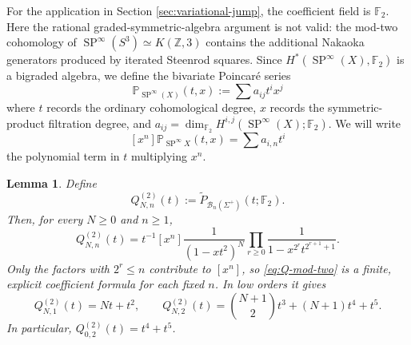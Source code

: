 \documentclass[11pt,a4paper]{article}
\numberwithin{equation}{section}
\newtheorem{lem}[thm]{Lemma}
\theoremstyle{definition}
\theoremstyle{remark}
\newcommand{\Si}{\Sigma}
\newcommand{\wt}{\widetilde}
\newcommand{\BB}{\mathcal B}
\newcommand{\SP}{\operatorname{SP}}
\begin{document}
For the application in Section \ref{sec:variational-jump}, the coefficient
field is \(\mathbb F_2\).  Here the rational graded-symmetric-algebra
argument is not valid: the mod-two cohomology of
\(\SP^\infty(S^3)\simeq K(\mathbb Z,3)\) contains the additional Nakaoka
generators produced by iterated Steenrod squares. Since $H^*(\SP^\infty (X),\mathbb F_2)$ is a bigraded algebra, we define the bivariate Poincar\'e series 
$$ {\mathbb P}_{\SP^\infty (X)}(t,x) := \sum a_{ij} t^ix^j$$
where $t$ records the ordinary cohomological degree, $x$ records the symmetric-product filtration degree, and $a_{ij} = \dim_{\mathbb F_2} H^{i,j}(\SP^\infty (X);\mathbb F_2)$. We will write 
$$[x^n]\mathbb P_{\SP^\infty X}(t,x) = \sum a_{i,n}t^i$$
the polynomial term in $t$ multiplying $x^n$.

\begin{lem}\label{lem:Q-mod-two}
Define
\[
Q^{(2)}_{N,n}(t):=
\wt P_{\BB_n(\Si^+)}(t;\mathbb F_2).
\]
Then, for every \(N\ge0\) and \(n\ge1\),
\begin{equation}\label{eq:Q-mod-two}
Q^{(2)}_{N,n}(t)
=
t^{-1}[x^n]
\frac{1}{(1-xt^2)^N}
\prod_{r\ge0}
\frac{1}{1-x^{2^r}t^{2^{r+1}+1}}.
\end{equation}
Only the factors with \(2^r\le n\) contribute to \([x^n]\), so
\eqref{eq:Q-mod-two} is a finite, explicit coefficient formula for each
fixed \(n\).  In low orders it gives
\begin{equation}\label{eq:Q-mod-two-low-orders}
Q^{(2)}_{N,1}(t)=Nt+t^2,
\qquad
Q^{(2)}_{N,2}(t)
=\binom{N+1}{2}t^3+(N+1)t^4+t^5.
\end{equation}
In particular,
\(Q^{(2)}_{0,2}(t)=t^4+t^5\).
\end{lem}
\end{document}
